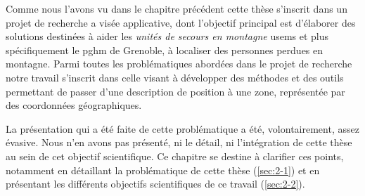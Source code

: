 Comme nous l'avons vu dans le chapitre précédent cette thèse s'inscrit
dans un projet de recherche a visée applicative, dont l'objectif
principal est d’élaborer des solutions destinées à aider les
\emph{unités de secours en montagne} \acp{usem} et plus spécifiquement
le \ac{pghm} de Grenoble, à localiser des personnes perdues en
montagne. Parmi toutes les problématiques abordées dans le projet de
recherche  notre travail s'inscrit dans celle visant à
développer des méthodes et des outils permettant de passer d'une
description de position à une zone, représentée par des coordonnées
géographiques.

La présentation qui a été faite de cette problématique a été,
volontairement, assez évasive. Nous n'en avons pas présenté, ni le
détail, ni l'intégration de cette thèse au sein de cet objectif
scientifique. Ce chapitre se destine à clarifier ces points, notamment
en détaillant la problématique de cette thèse (\autoref{sec:2-1}) et en
présentant les différents objectifs scientifiques de ce travail
(\autoref{sec:2-2}).

